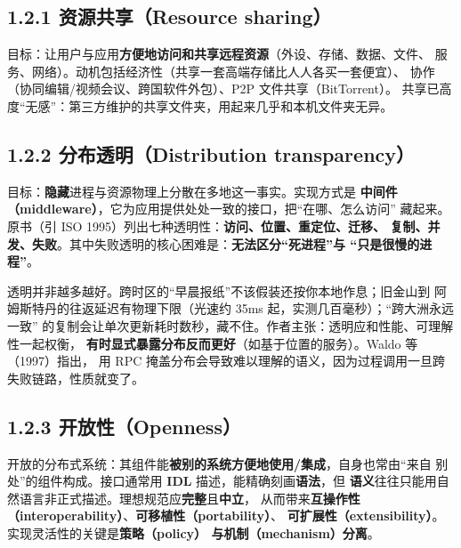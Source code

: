 

\subsection*{1.2.1 资源共享（Resource sharing）}
目标：让用户与应用\textbf{方便地访问和共享远程资源}（外设、存储、数据、文件、
服务、网络）。动机包括经济性（共享一套高端存储比人人各买一套便宜）、
协作（协同编辑/视频会议、跨国软件外包）、P2P 文件共享（BitTorrent）。
共享已高度“无感”：第三方维护的共享文件夹，用起来几乎和本机文件夹无异。


\subsection*{1.2.2 分布透明（Distribution transparency）}
目标：\textbf{隐藏}进程与资源物理上分散在多地这一事实。实现方式是
\textbf{中间件（middleware）}，它为应用提供处处一致的接口，把“在哪、怎么访问”
藏起来。原书（引 ISO 1995）列出七种透明性：\textbf{访问、位置、重定位、迁移、
复制、并发、失败}。其中失败透明的核心困难是：\textbf{无法区分“死进程”与
“只是很慢的进程”}。

\begin{closeread}
\end{closeread}


\begin{ideabox}
透明并非越多越好。跨时区的“早晨报纸”不该假装还按你本地作息；旧金山到
阿姆斯特丹的往返延迟有物理下限（光速约 35ms 起，实测几百毫秒）；“跨大洲永远一致”
的复制会让单次更新耗时数秒，藏不住。作者主张：透明应和性能、可理解性一起权衡，
\textbf{有时显式暴露分布反而更好}（如基于位置的服务）。Waldo 等（1997）指出，
用 RPC 掩盖分布会导致难以理解的语义，因为过程调用一旦跨失败链路，性质就变了。
\end{ideabox}

\subsection*{1.2.3 开放性（Openness）}
开放的分布式系统：其组件能\textbf{被别的系统方便地使用/集成}，自身也常由“来自
别处”的组件构成。接口通常用 \textbf{IDL} 描述，能精确刻画\textbf{语法}，但
\textbf{语义}往往只能用自然语言非正式描述。理想规范应\textbf{完整}且\textbf{中立}，
从而带来\textbf{互操作性（interoperability）}、\textbf{可移植性（portability）}、
\textbf{可扩展性（extensibility）}。实现灵活性的关键是\textbf{策略（policy）
与机制（mechanism）分离}。

